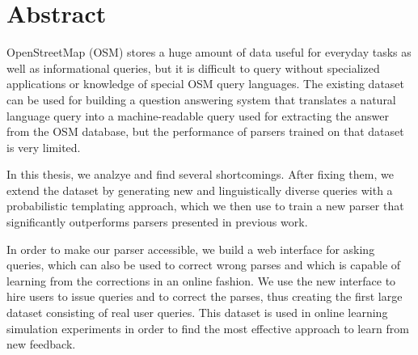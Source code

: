 \chapter{Abstract}
\label{ch:abstract-english}

OpenStreetMap (OSM) stores a huge amount of data useful for everyday tasks as
well as informational queries, but it is difficult to query without specialized
applications or knowledge of special OSM query languages. The existing
\nlmapstwo{} dataset can be used for building a question answering system that
translates a natural language query into a machine-readable query used for
extracting the answer from the OSM database, but the performance of parsers
trained on that dataset is very limited.

In this thesis, we analzye \nlmapstwo{} and find several shortcomings. After
fixing them, we extend the dataset by generating new and linguistically diverse
queries with a probabilistic templating approach, which we then use to train a
new parser that significantly outperforms parsers presented in previous work.

In order to make our parser accessible, we build a web interface for asking
queries, which can also be used to correct wrong parses and which is capable of
learning from the corrections in an online fashion. We use the new interface to
hire users to issue queries and to correct the parses, thus creating the first
large \nlmaps{} dataset consisting of real user queries. This dataset is used in
online learning simulation experiments in order to find the most effective
approach to learn from new feedback.

